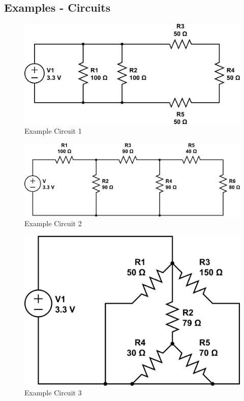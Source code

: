 \documentclass[14pt]{memoir}
\begin{document}
\subsection{Examples - Circuits}

\begin{figure}[H]
\begin{center}
\includegraphics[scale=0.50]{fig/circuit2.png}
\caption{Example Circuit 1}
\label{fig:cir1}
\end{center}
\end{figure}

\begin{figure}[H]
\begin{center}
\includegraphics[scale=0.50]{fig/circuit1.png}
\caption{Example Circuit 2}
\label{fig:cir2}
\end{center}
\end{figure}

\begin{figure}[H]
\begin{center}
\includegraphics[scale=0.40]{fig/circuit3.png}
\caption{Example Circuit 3}
\label{fig:cir3}
\end{center}
\end{figure}
\end{document}
